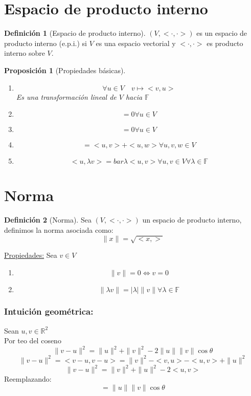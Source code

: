 \documentclass[11pt]{book}
\newcommand{\set}[1]{\mathbb{#1}}
\newtheorem{prop}[thm]{Proposición}
\theoremstyle{definition}
\newtheorem{defn}{Definición}[section]
\begin{document}
\section{Espacio de producto interno}
\begin{defn}[Espacio de producto interno]
	$(V,<\cdot,\cdot>)$ es un espacio de producto interno (e.p.i.) si $V$ es una espacio vectorial y $<\cdot,\cdot>$ es producto interno sobre $V$.
\end{defn}
\begin{prop}[Propiedades básicas]
	\
	\begin{enumerate}[label=(\alph*)]
		\item \[\forall u\in V\quad v\mapsto <v,u> \]
		      Es una transformación lineal de $V$ hacia $\set{F}$

		\item \[<0,u>=0\forall u\in V\]

		\item \[<u,0>=0\forall u\in V\]

		\item \[<u,v+w>=<u,v>+<u,w>\forall u,v,w\in V\]

		\item \[<u,\lambda v>=bar{\lambda}<u,v>\forall u,v\in V \forall \lambda\in\set{F}\]
	\end{enumerate}
\end{prop}
\section{Norma}
\begin{defn}[Norma]
	Sea $(V,<\cdot,\cdot>)$ un espacio de producto interno, definimos la norma asociada como:
	\[\|x\|=\sqrt{<x,>}\]
\end{defn}
\underline{Propiedades:} Sea $v\in V$
\begin{enumerate}[label=(\alph*)]
	\item \[\|v\|=0\iff v=0\]

	\item \[\|\lambda v\|=|\lambda|\|v\|\forall \lambda\in \set{F}\]
\end{enumerate}
\subsubsection{Intuición geométrica:}
Sean $u,v\in\set{R}^2$\\
Por teo del coseno
\[\|v-u\|^2=\|u\|^2+\|v\|^2-2\|u\|\|v\|\cos\theta\]
\[\|v-u\|^2=<v-u,v-u>=\|v\|^2-<v,u>-<u,v>+\|u\|^2\]
\[\|v-u\|^2=\|v\|^2+\|u\|^2-2<u,v>\]
Reemplazando:
\[<u,v>=\|u\|\|v\|\cos\theta\]
\end{document}

